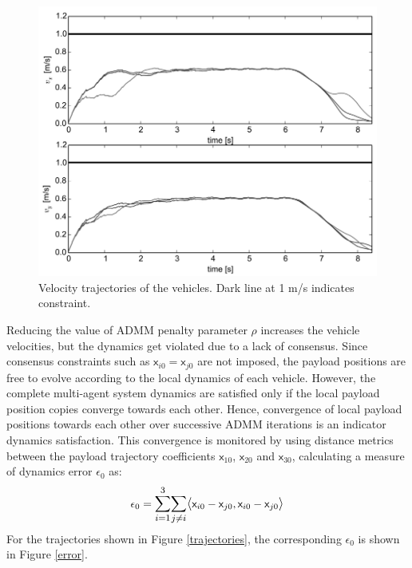 \documentclass[letterpaper, 10 pt, conference]{ieeeconf}
\newcommand{\cx}{\textsf{x}}
\begin{document}
\begin{figure}[H]
	\centering
	\includegraphics[scale=0.50]{figures/velocities.pdf}
	\caption{Velocity trajectories of the vehicles. Dark line at 1 m/s indicates constraint.}
	\label{velocities}
\end{figure}
\indent
 Reducing the value of ADMM penalty parameter $\rho$ increases the vehicle velocities, but the dynamics get violated due to a lack of consensus. 
Since consensus constraints such as $\cx_{i0} = \cx_{j0}$ are not imposed, the payload positions are free to evolve according to the local dynamics of each vehicle. However, the complete multi-agent system dynamics are satisfied only if the local payload position copies converge towards each other. Hence, convergence of local payload positions towards each other over successive ADMM iterations is an indicator dynamics satisfaction. This convergence is monitored by using distance metrics between the payload trajectory coefficients $\cx_{10}$, $\cx_{20}$ and $\cx_{30}$,  calculating a measure of dynamics error $\epsilon_0$ as:
\begin{equation}
\epsilon_0 = \mathlarger{\sum_{i=1}^{3}} \mathlarger{\sum_{j \neq i}} \mathlarger{\langle} \cx_{i0} - \cx_{j0},\cx_{i0} - \cx_{j0} \mathlarger{\rangle}
\end{equation}
For the trajectories shown in Figure \ref{trajectories}, the corresponding $\epsilon_{0}$ is shown in Figure \ref{error}.
\end{document}
